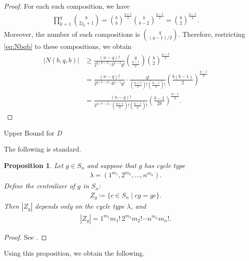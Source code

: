 \documentclass[12pt,reqno]{amsart}
\makeatletter
\newif\if@noindentafterheading
\renewcommand\subsection{\@startsection{subsection}{2}{\z@}%
  {-2.5ex \@plus -.3ex \@minus -.2ex}%
  {1.5ex \@plus .2ex}%
  {\normalfont\bfseries}%
}
\let\orig@subsection\subsection
\renewcommand\subsection{%
  \@ifstar{\subsection@star}{\subsection@nostar}%
}
\newcommand\subsection@nostar{%
  \@ifnextchar[{\subsection@opt}{\subsection@noopt}%
}
\newcommand\subsection@opt[2][]{%
  \global\@noindentafterheadingtrue
  \orig@subsection[#1]{#2}%
  \global\@noindentafterheadingfalse
}
\newcommand\subsection@noopt[1]{%
  \global\@noindentafterheadingtrue
  \orig@subsection{#1}%
  \global\@noindentafterheadingfalse
}
\newcommand\subsection@star[1]{%
  \global\@noindentafterheadingtrue
  \orig@subsection*{#1}%
  \global\@noindentafterheadingfalse
}
\newcommand{\la}{\lambda}								%
\newcommand{\f}[2]{\frac{#1}{#2}}							%
\newcommand{\ceq}{\coloneqq} 							%
\newcommand{\vt}[1]{\left\lvert #1 \right\rvert}					%
\theoremstyle{mythmstyle}
\newtheorem{prop}[lemma]{Proposition}
\theoremstyle{mydefstyle}
\numberwithin{equation}{section}
\makeatother
\begin{document}
\begin{proof}
For each such composition, we have
\begin{align}
\prod_{k=1}^{q}\binom{b}{2j_{k}+1} = \binom{b}{b}^{\f{q+1}{2}}\binom{b}{b-2}^{\f{q-1}{2}} = \binom{b}{2}^{\f{q-1}{2}}.
\end{align}
Moreover, the number of such compositions is
$\binom{q}{(q-1)/2}$.
Therefore, restricting \eqref{eq:Nbqb} to these compositions, we obtain
\begin{align}
\vt{N(b, q, b)} &\ge \f{(n-q)!}{2^{q(b-2)}b^{q-1}q!}\binom{q}{\f{q-1}{2}}\binom{b}{2}^{\f{q-1}{2}} \\
&= \f{(n-q)!}{2^{q(b-2)}b^{q-1}q!}\cdot \f{q!}{\left(\f{q+1}{2}\right)!\left(\f{q-1}{2}\right)!}\left(\f{b(b-1)}{2}\right)^{\f{q-1}{2}} \\
&= \f{(n-q)!}{2^{q(b-2)}\left(\f{q+1}{2}\right)!\left(\f{q-1}{2}\right)!}\left(\f{b-1}{2b}\right)^{\f{q-1}{2}}.
\end{align}
\end{proof}

\subsection{Upper Bound for \textit{D}}

The following is standard.
\begin{prop}
\label{prop:Zg}
Let $g \in S_{n}$ and suppose that $g$ has cycle type
\begin{align}
\la = (1^{m_{1}}, 2^{m_{2}}, \ldots, n^{m_{n}}).
\end{align}
Define the centralizer of $g$ in $S_{n}$:
\begin{align}
Z_{g} \ceq \{ c \in S_{n} \mid cg = gc \}.
\end{align}
Then $\vt{Z_{g}}$ depends only on the cycle type $\la$, and
\begin{align}
\vt{Z_{g}} = 1^{m_{1}}m_{1}!\, 2^{m_{2}}m_{2}! \cdots n^{m_{n}}m_{n}!.
\end{align}
\end{prop}

\begin{proof}
See \cite[Proposition~1.1.1]{Sagan01}.
\end{proof}

Using this proposition, we obtain the following.
\end{document}
